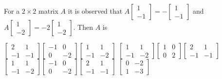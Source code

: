 \begin{question}[id=gate-in2006-1, source=GATE IN 2006, marks=2]
For a $2 \times 2$ matrix $A$ it is observed that $A\begin{bmatrix} 1 \\ -1 \end{bmatrix} = -\begin{bmatrix} 1 \\ -1 \end{bmatrix}$ and $A\begin{bmatrix} 1 \\ -2 \end{bmatrix} = -2\begin{bmatrix} 1 \\ -2 \end{bmatrix}$. Then $A$ is
\begin{options}
  \option $\begin{bmatrix} 2 & 1 \\ -1 & -1 \end{bmatrix}\begin{bmatrix} -1 & 0 \\ 0 & -2 \end{bmatrix}\begin{bmatrix} 1 & 1 \\ -1 & -2 \end{bmatrix}$
  \option $\begin{bmatrix} 1 & 1 \\ -1 & -2 \end{bmatrix}\begin{bmatrix} 1 & 0 \\ 0 & 2 \end{bmatrix}\begin{bmatrix} 2 & 1 \\ -1 & -1 \end{bmatrix}$
  \correct $\begin{bmatrix} 1 & 1 \\ -1 & -2 \end{bmatrix}\begin{bmatrix} -1 & 0 \\ 0 & -2 \end{bmatrix}\begin{bmatrix} 2 & 1 \\ -1 & -1 \end{bmatrix}$
  \option $\begin{bmatrix} 0 & -2 \\ 1 & -3 \end{bmatrix}$
\end{options}

\end{question}
